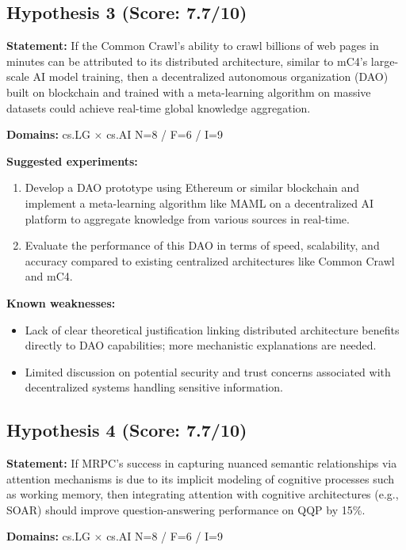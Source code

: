 \documentclass[12pt,a4paper]{article}
\begin{document}
\subsection*{Hypothesis 3 (Score: 7.7/10)}

\textbf{Statement:} If the Common Crawl's ability to crawl billions of web pages in minutes can be attributed to its distributed architecture, similar to mC4's large-scale AI model training, then a decentralized autonomous organization (DAO) built on blockchain and trained with a meta-learning algorithm on massive datasets could achieve real-time global knowledge aggregation.

\noindent\textbf{Domains:} cs.LG $\times$ cs.AI
\hspace{1em} N=8 / F=6 / I=9

\textbf{Suggested experiments:}
\begin{enumerate}
  \item Develop a DAO prototype using Ethereum or similar blockchain and implement a meta-learning algorithm like MAML on a decentralized AI platform to aggregate knowledge from various sources in real-time.
  \item Evaluate the performance of this DAO in terms of speed, scalability, and accuracy compared to existing centralized architectures like Common Crawl and mC4.
\end{enumerate}

\textbf{Known weaknesses:}
\begin{itemize}
  \item Lack of clear theoretical justification linking distributed architecture benefits directly to DAO capabilities; more mechanistic explanations are needed.
  \item Limited discussion on potential security and trust concerns associated with decentralized systems handling sensitive information.
\end{itemize}
\subsection*{Hypothesis 4 (Score: 7.7/10)}

\textbf{Statement:} If MRPC's success in capturing nuanced semantic relationships via attention mechanisms is due to its implicit modeling of cognitive processes such as working memory, then integrating attention with cognitive architectures (e.g., SOAR) should improve question-answering performance on QQP by 15\%.

\noindent\textbf{Domains:} cs.LG $\times$ cs.AI
\hspace{1em} N=8 / F=6 / I=9
\end{document}

